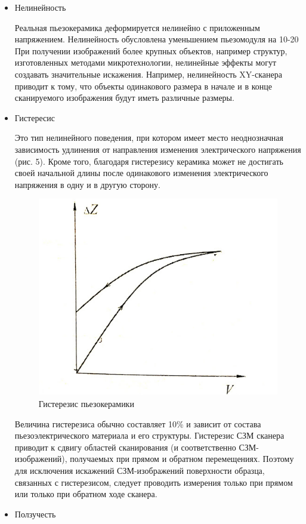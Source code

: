\documentclass[a4paper,12pt]{article}
\theoremstyle{plain} %
\theoremstyle{definition} %
\theoremstyle{remark} %
\begin{document}
\begin{itemize}
	\item
	Нелинейность
	
	
	Реальная пьезокерамика деформируется нелинейно с приложенным напряжением. Нелинейность обусловлена уменьшением пьезомодуля на 10-20%
	При получении изображений более крупных объектов, например структур, изготовленных методами микротехнологии, нелинейные эффекты могут создавать значительные искажения. Например, нелинейность XY-сканера приводит к тому, что объекты одинакового размера в начале и в конце сканируемого изображения будут иметь различные размеры.
	\item
	Гистересис 
	
	
	Это тип нелинейного поведения, при котором имеет место неоднозначная зависимость удлинения от направления изменения электрического напряжения (рис. 5). Кроме того, благодаря гистерезису керамика может не достигать своей начальной длины после одинакового изменения электрического напряжения в одну и в другую сторону.
	\begin{figure}[h!]
		\centering
		\includegraphics[scale=0.6]{pic8.jpg}
		\caption{Гистерезис пьезокерамики}
		\label{pic8}
	\end{figure}
	Величина гистерезиса обычно составляет 10\% и зависит от состава пьезоэлектрического материала и его структуры.
	Гистерезис СЗМ сканера приводит к сдвигу областей сканирования (и соответственно СЗМ-изображений), получаемых при прямом и обратном перемещениях. Поэтому для исключения искажений СЗМ-изображений поверхности образца, связанных с гистерезисом, следует проводить измерения только при прямом или только при обратном ходе сканера.
	\item 
	Ползучесть 
	

\end{itemize}
\end{document}
